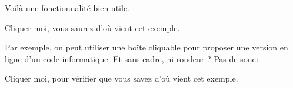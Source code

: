 \documentclass[varwidth, border = 3pt]{standalone}
\begin{document}
Voilà une fonctionnalité bien utile.

%
%
\begin{tcolorbox}[
    enhanced,
    title    = Une boîte pointant vers l'extérieur,
    hyperurl = https://www.latex-project.org/news/2023/03/17/TLC3/,
]
    Cliquer moi, vous saurez d'où vient cet exemple.
\end{tcolorbox}

Par exemple, on peut utiliser une boîte cliquable pour proposer une version en ligne d'un code informatique. Et sans cadre, ni rondeur ? Pas de souci.

\begin{tcolorbox}[
    enhanced,
    sharp corners,
    notitle,
    hyperurl = https://www.latex-project.org/news/2023/03/17/TLC3/,
    colback  = blue!20,
    colframe = blue!20,
    boxrule  = 0pt,
    top      = 0pt,
    bottom   = 0pt,
    left     = 0pt,
    right    = 0pt,
]
    Cliquer moi, pour vérifier que vous savez d'où vient cet exemple.
\end{tcolorbox}
\end{document}

